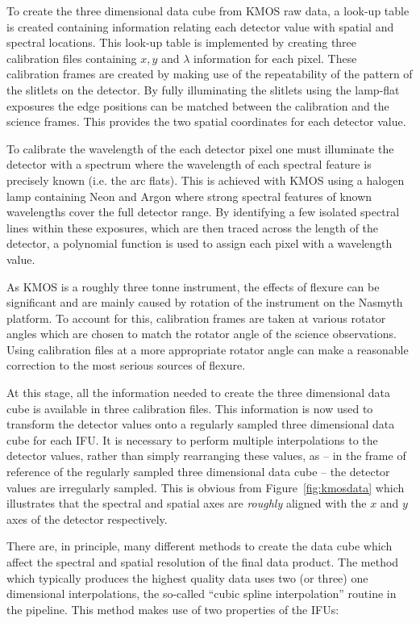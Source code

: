 To create the three dimensional data cube from KMOS raw data, a look-up table is created containing information relating each detector value with spatial and spectral locations.
This look-up table is implemented by creating three calibration files containing $x, y$ and $\lambda$ information for each pixel.
These calibration frames are created by making use of the repeatability of the pattern of the slitlets on the detector.
By fully illuminating the slitlets using the lamp-flat exposures the edge positions can be matched between the calibration and the science frames.
This provides the two spatial coordinates for each detector value.

To calibrate the wavelength of the each detector pixel one must illuminate the detector with a spectrum where the wavelength of each spectral feature is precisely known (i.e. the arc flats).
This is achieved with KMOS using a halogen lamp containing Neon and Argon where strong spectral features of known wavelengths cover the full detector range.
By identifying a few isolated spectral lines within these exposures, which are then traced across the length of the detector, a polynomial function is used to assign each pixel with a wavelength value.

As KMOS is a roughly three tonne instrument, the effects of flexure can be significant and are mainly caused by rotation of the instrument on the Nasmyth platform.
To account for this, calibration frames are taken at various rotator angles which are chosen to match the rotator angle of the science observations.
Using calibration files at a more appropriate rotator angle can make a reasonable correction to the most serious sources of flexure.


At this stage, all the information needed to create the three dimensional data cube is available in three calibration files.
This information is now used to transform the detector values onto a regularly sampled three dimensional data cube for each IFU.
It is necessary to perform multiple interpolations to the detector values, rather than simply rearranging these values, as -- in the frame of reference of the regularly sampled three dimensional data cube -- the detector values are irregularly sampled.
This is obvious from Figure~\ref{fig:kmosdata} which illustrates that the spectral and spatial axes are \textit{roughly} aligned with the $x$ and $y$ axes of the detector respectively.

There are, in principle, many different methods to create the data cube which affect the spectral and spatial resolution of the final data product.
The method which typically produces the highest quality data uses two (or three) one dimensional interpolations, the so-called ``cubic spline interpolation'' routine in the pipeline.
This method makes use of two properties of the IFUs:

